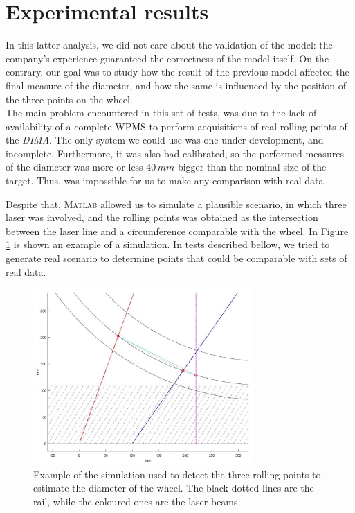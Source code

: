 \section{Experimental results}
In this latter analysis, we did not care about the validation of the model: the company's experience guaranteed the correctness of the model itself. On the contrary, our goal was to study how the result of the previous model affected the final measure of the diameter, and how the same is influenced by the position of the three points on the wheel. \\

The main problem encountered in this set of tests, was due to the lack of availability of a complete \acs{WPMS} to perform acquisitions of real rolling points of the \textit{DIMA}. The only system we could use was one under development, and incomplete. Furthermore, it was also bad calibrated, so the performed measures of the diameter was more or less $40 \, mm$ bigger than the nominal size of the target. Thus, was impossible for us to make any comparison with real data.

Despite that, \textsc{Matlab} allowed us to simulate a plausible scenario, in which three laser was involved, and the rolling points was obtained as the intersection between the laser line and a circumference comparable with the wheel. In Figure \ref{fig:diam:virtual} is shown an example of a simulation. In tests described bellow, we tried to generate real scenario to determine points that could be comparable with sets of real data.
  \begin{figure}[t!]
    \centering
    \includegraphics[width=0.75\textwidth]{./images/diameter/virtual.jpg}
    \caption{Example of the simulation used to detect the three rolling points to estimate the diameter of the wheel. The black dotted lines are the rail, while the coloured ones are the laser beams.}
    \label{fig:diam:virtual}
  \end{figure}

